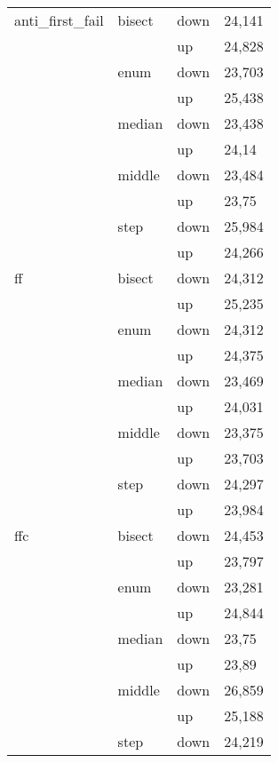 \begin{longtable}{llll}
\multicolumn{1}{l}{anti\_first\_fail} & \multicolumn{1}{l}{bisect} & down  & 24,141 \\
          &       & up    & 24,828 \\
          & \multicolumn{1}{l}{enum} & down  & 23,703 \\
          &       & up    & 25,438 \\
          & \multicolumn{1}{l}{median} & down  & 23,438 \\
          &       & up    & 24,14 \\
          & \multicolumn{1}{l}{middle} & down  & 23,484 \\
          &       & up    & 23,75 \\
          & \multicolumn{1}{l}{step} & down  & 25,984 \\
          &       & up    & 24,266 \\ \hline
    \multicolumn{1}{l}{ff} & \multicolumn{1}{l}{bisect} & down  & 24,312 \\
          &       & up    & 25,235 \\
          & \multicolumn{1}{l}{enum} & down  & 24,312 \\
          &       & up    & 24,375 \\
          & \multicolumn{1}{l}{median} & down  & 23,469 \\
          &       & up    & 24,031 \\
          & \multicolumn{1}{l}{middle} & down  & 23,375 \\
          &       & up    & 23,703 \\
          & \multicolumn{1}{l}{step} & down  & 24,297 \\
          &       & up    & 23,984 \\ \hline
    \multicolumn{1}{l}{ffc} & \multicolumn{1}{l}{bisect} & down  & 24,453 \\
          &       & up    & 23,797 \\
          & \multicolumn{1}{l}{enum} & down  & 23,281 \\
          &       & up    & 24,844 \\
          & \multicolumn{1}{l}{median} & down  & 23,75 \\
          &       & up    & 23,89 \\
          & \multicolumn{1}{l}{middle} & down  & 26,859 \\
          &       & up    & 25,188 \\
          & \multicolumn{1}{l}{step} & down  & 24,219 \\

\end{longtable}
